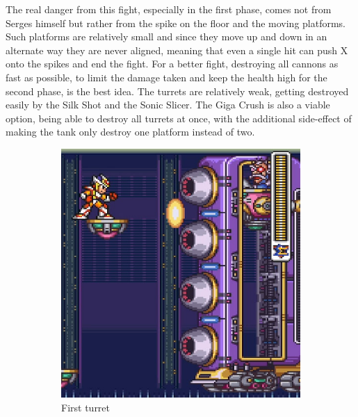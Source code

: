 The real danger from this fight, especially in the first phase, comes not from Serges himself but rather from the spike on the floor and the moving platforms. Such platforms are relatively small and since they move up and down in an alternate way they are never aligned, meaning that even a single hit can push X onto the spikes and end the fight. For a better fight, destroying all cannons as fast as possible, to limit the damage taken and keep the health high for the second phase, is the best idea. The turrets are relatively weak, getting destroyed easily by the Silk Shot and the Sonic Slicer. The Giga Crush is also a viable option, being able to destroy all turrets at once, with the additional side-effect of making the tank only destroy one platform instead of two.
\begin{figure}[htp]
	\centering
	\begin{subfigure}{0.32\linewidth}
		\centering
		\includegraphics[width=\linewidth]{figures/X2/Hunter_stages/Serges_tank_1.png}
		\caption{First turret}	
	\end{subfigure}
	\begin{subfigure}{0.32\linewidth}
		\centering

\end{subfigure}
\end{figure}
